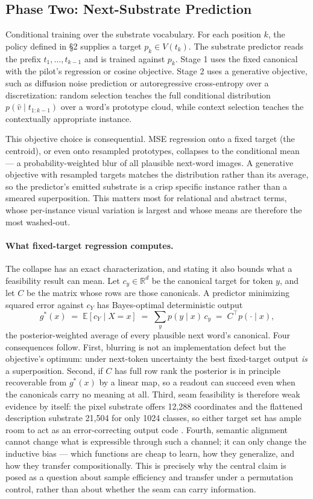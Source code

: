 \documentclass[11pt,a4paper]{article}
\begin{document}
\subsection{Phase Two: Next-Substrate Prediction}

Conditional training over the substrate vocabulary. For each position $k$, the policy defined in §2 supplies a target $p_k \in V(t_k)$. The substrate predictor reads the prefix $t_1, \dots, t_{k-1}$ and is trained against $p_k$. Stage 1 uses the fixed canonical with the pilot's regression or cosine objective. Stage 2 uses a generative objective, such as diffusion noise prediction or autoregressive cross-entropy over a discretization: random selection teaches the full conditional distribution $p(\hat v \mid t_{1:k-1})$ over a word's prototype cloud, while context selection teaches the contextually appropriate instance.

This objective choice is consequential. MSE regression onto a fixed target (the centroid), or even onto resampled prototypes, collapses to the conditional mean --- a probability-weighted blur of all plausible next-word images. A generative objective with resampled targets matches the distribution rather than its average, so the predictor's emitted substrate is a crisp specific instance rather than a smeared superposition. This matters most for relational and abstract terms, whose per-instance visual variation is largest and whose means are therefore the most washed-out.

\paragraph{What fixed-target regression computes.} The collapse has an exact characterization, and stating it also bounds what a feasibility result can mean. Let $c_y \in \mathbb{R}^d$ be the canonical target for token $y$, and let $C$ be the matrix whose rows are those canonicals. A predictor minimizing squared error against $c_Y$ has Bayes-optimal deterministic output
\[
  g^*(x) \;=\; \mathbb{E}\!\left[c_Y \mid X = x\right] \;=\; \sum_y p(y \mid x)\, c_y \;=\; C^{\top} p(\cdot \mid x),
\]
the posterior-weighted average of every plausible next word's canonical. Four consequences follow. First, blurring is not an implementation defect but the objective's optimum: under next-token uncertainty the best fixed-target output \emph{is} a superposition. Second, if $C$ has full row rank the posterior is in principle recoverable from $g^*(x)$ by a linear map, so a readout can succeed even when the canonicals carry no meaning at all. Third, seam feasibility is therefore weak evidence by itself: the pixel substrate offers 12,288 coordinates and the flattened description substrate 21,504 for only 1024 classes, so either target set has ample room to act as an error-correcting output code \cite{ecoc2019}. Fourth, semantic alignment cannot change what is expressible through such a channel; it can only change the inductive bias --- which functions are cheap to learn, how they generalize, and how they transfer compositionally. This is precisely why the central claim is posed as a question about sample efficiency and transfer under a permutation control, rather than about whether the seam can carry information.
\end{document}
